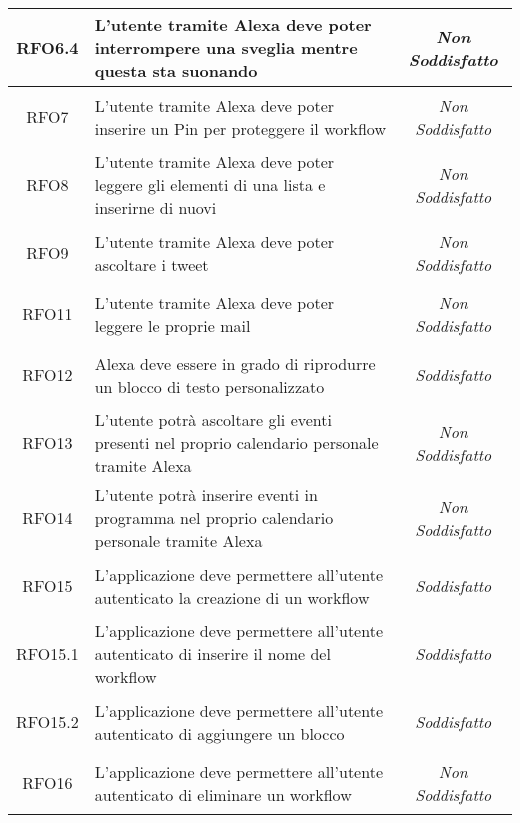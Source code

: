 \begin{longtable}{|c|>{\centering}m{7cm}|c|}
	\hypertarget{RFO6.4}{RFO6.4} & L'utente tramite Alexa deve poter interrompere una sveglia mentre questa sta suonando & {\textit{Non Soddisfatto}}\\ \hline
	
	\hypertarget{RFO7}{RFO7} & L'utente tramite Alexa deve poter inserire un Pin per proteggere il workflow & {\textit{Non Soddisfatto}}\\ \hline
	
	\hypertarget{RFO8}{RFO8} & L'utente tramite Alexa deve poter leggere gli elementi di una lista e inserirne di nuovi & {\textit{Non Soddisfatto}}\\ \hline
	
	\hypertarget{RFO9}{RFO9} & L'utente tramite Alexa deve poter ascoltare i tweet & {\textit{Non Soddisfatto}}\\ \hline
	
	\hypertarget{RFO11}{RFO11} & L'utente tramite Alexa deve poter leggere le proprie mail & {\textit{Non Soddisfatto}}\\ \hline
	
	\hypertarget{RFO12}{RFO12} & Alexa deve essere in grado di riprodurre un blocco di testo personalizzato & {\textit{Soddisfatto}}\\ \hline
	
	\hypertarget{RFO13}{RFO13} & L'utente potrà ascoltare gli eventi presenti nel proprio calendario personale tramite Alexa & {\textit{Non Soddisfatto}}\\ \hline
	
	\hypertarget{RFO14}{RFO14} & L'utente potrà inserire eventi in programma nel proprio calendario personale tramite Alexa & {\textit{Non Soddisfatto}}\\ \hline
	
	\hypertarget{RFO15}{RFO15} & L'applicazione deve permettere all'utente autenticato la creazione di un workflow & {\textit{Soddisfatto}}\\ \hline
	
	\hypertarget{RFO15.1}{RFO15.1} & L'applicazione deve permettere all'utente autenticato di inserire il nome del workflow & {\textit{Soddisfatto}}\\ \hline
	
	\hypertarget{RFO15.2}{RFO15.2} & L'applicazione deve permettere all'utente autenticato di aggiungere un blocco & {\textit{Soddisfatto}}\\ \hline
	
	\hypertarget{RFO16}{RFO16} & L'applicazione deve permettere all'utente autenticato di eliminare un workflow & {\textit{Non Soddisfatto}}\\ \hline
	

\end{longtable}
